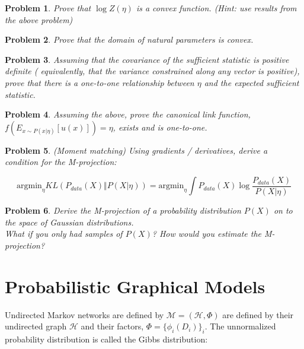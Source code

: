 \documentclass[a4paper]{article}
\newtheorem{problem}{Problem}[section]
\begin{document}
\begin{problem}
Prove that $ \log Z(\eta)$ is a convex function.
(Hint: use results from the above problem)
\end{problem}

\begin{problem}
Prove that the domain of natural parameters is convex.
\end{problem}

\begin{problem}
Assuming that the covariance of the sufficient statistic is positive definite ( equivalently, that the variance constrained along any vector is positive), prove that there is a one-to-one relationship between $\eta$ and the expected sufficient statistic.
\end{problem}

\begin{problem}
Assuming the above, prove the canonical link function, $f( E_{ x \sim P( x \vert \eta) } [ u(x) ] ) = \eta $, exists and is one-to-one.
\end{problem}

\begin{problem}
(Moment matching) Using gradients / derivatives, derive a condition for the M-projection:

\begin{equation}
  \text{argmin}_\eta KL \left( P_{data}(X) \Vert P( X \vert \eta) \right) = \text{argmin}_\eta \int P_{data}(X) \log \frac{ P_{data}(X) }{ P( X \vert \eta) }
  \label{}
\end{equation}
\end{problem}

\begin{problem}
  Derive the M-projection of a probability distribution $P(X)$ on to the space of Gaussian distributions.  \\
  What if you only had samples of $P(X)$?  How would you estimate the M-projection?
\end{problem}

\section{Probabilistic Graphical Models}

Undirected Markov networks are defined by $\mathcal{M} = \left( \mathcal{H}, \Phi \right) $ are defined by their undirected graph $\mathcal{H}$ and their factors, $\Phi = \{ \phi_i(D_i) \}_i$.  
The unnormalized probability distribution is called the Gibbs distribution:
\end{document}
